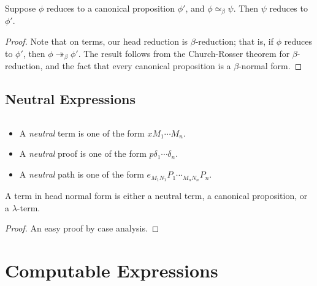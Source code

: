 \documentclass[a4paper,UKenglish]{lipics-v2016}
\theoremstyle{plain}
\begin{document}
\begin{lemma}
\label{lm:compat-beta}
Suppose $\phi$ reduces to a canonical proposition $\phi'$, and $\phi \simeq_\beta \psi$.  Then $\psi$ reduces to $\phi'$.
\end{lemma}

\begin{proof}
Note that on terms, our head reduction is $\beta$-reduction; that is, if $\phi$ reduces to $\phi'$, then $\phi \twoheadrightarrow_\beta \phi'$.
The result follows from the Church-Rosser theorem for $\beta$-reduction, and the fact that every canonical proposition is a $\beta$-normal form.
\end{proof}

\subsection{Neutral Expressions}

\begin{definition}[Neutral]$ $
\begin{itemize}
\item
A \emph{neutral} term is one of the form $x M_1 \cdots M_n$.
\item
A \emph{neutral} proof is one of the form $p \delta_1 \cdots \delta_n$.
\item
A \emph{neutral} path is one of the form $e_{M_1 N_1} P_1 \cdots_{M_n N_n} P_n$.
\end{itemize}
\end{definition}

\begin{lemma}
A term in head normal form is either a neutral term, a canonical proposition, or a $\lambda$-term.
\end{lemma}

\begin{proof}
An easy proof by case analysis.
\end{proof}

\section{Computable Expressions}
\end{document}
